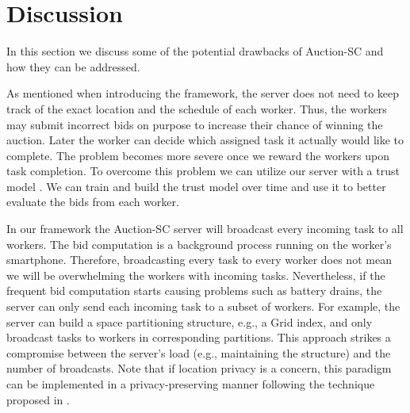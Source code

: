 \section{Discussion}
\label{sec:discuss}

In this section we discuss some of the potential drawbacks of Auction-SC and how they can be addressed.

As mentioned when introducing the framework, the server does not need to keep track of the exact location and the schedule of each worker. Thus, the workers may submit incorrect bids on purpose to increase their chance of winning the auction. Later the worker can decide which assigned task it actually would like to complete. The problem becomes more severe once we reward the workers upon task completion. To overcome this problem we can utilize our server with a trust model \cite{Ye15}. We can train and build the trust model over time and use it to better evaluate the bids from each worker.

In our framework the Auction-SC server will broadcast every incoming task to all workers. The bid computation is a background process running on the worker's smartphone. Therefore, broadcasting every task to every worker does not mean we will be overwhelming the workers with incoming tasks. Nevertheless, if the frequent bid computation starts causing problems such as battery drains, the server can only send each incoming task to a subset of workers.
For example, the server can build a space partitioning structure, e.g., a Grid index, and only broadcast tasks to workers in corresponding partitions.  This approach strikes a compromise between the server's load (e.g., maintaining the structure) and the number of broadcasts. Note that if location privacy is a concern, this paradigm can be implemented in a privacy-preserving manner following  the technique  proposed in \cite{To14}.